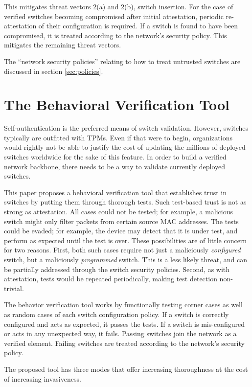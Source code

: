 \documentclass[journal]{IEEEtran}
\begin{document}
This mitigates threat vectors 2(a) and 2(b), switch insertion. For the case of verified switches
becoming compromised after initial attestation, periodic re-attestation of their configuration is
required. If a switch is found to have been compromised, it is treated according to the network's
security policy. This mitigates the remaining threat vectors.

The ``network security policies'' relating to how to treat untrusted switches are discussed in
section \ref{sec:policies}.



\section{The Behavioral Verification Tool}
Self-authentication is the preferred means of switch validation. However, switches typically are
outfitted with TPMs. Even if that were to begin, organizations would rightly not be able to justify
the cost of updating the millions of deployed switches worldwide for the sake of this feature. In
order to build a verified network backbone, there needs to be a way to validate currently deployed
switches.

This paper proposes a behavioral verification tool that establishes trust in switches by putting
them through thorough tests. Such test-based trust is not as strong as attestation. All cases could
not be tested; for example, a malicious switch might only filter packets from certain source MAC
addresses. The tests could be evaded; for example, the device may detect that it is under test, and
perform as expected until the test is over. These possibilities are of little concern for two
reasons. First, both such cases require not just a maliciously \textit{configured} switch, but a
maliciously \textit{programmed} switch. This is a less likely threat, and can be partially
addressed through the switch security policies. Second, as with attestation, tests would be
repeated periodically, making test detection non-trivial.

The behavior verification tool works by functionally testing corner cases as well as random cases
of each switch configuration policy. If a switch is correctly configured and acts as expected, it
passes the tests. If a switch is mis-configured or acts in any unexpected way, it fails. Passing
switches join the network as a verified element. Failing switches are treated according to the
network's security policy.

The proposed tool has three modes that offer increasing thoroughness at the cost of increasing
invasiveness.
\end{document}
